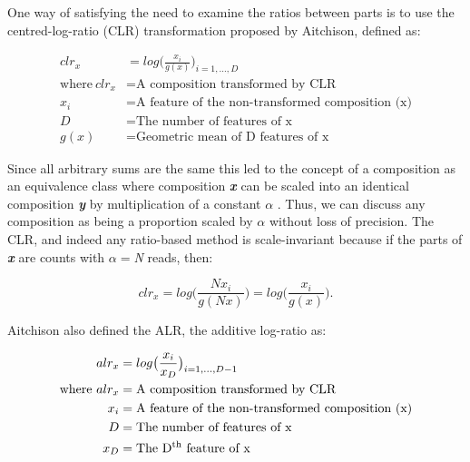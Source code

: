 \documentclass [10pt]{article}
\begin{document}
One way of satisfying the need to examine the ratios between parts is to use the centred-log-ratio (CLR) transformation proposed by Aitchison, defined as: 

\begin{equation}
\begin{split}
clr_x &= log  \big( \frac{x_i}{g(x)}   \big)_{i=1,\dots,D} \\
\text{where}~
	clr_x &= \text{A composition transformed by CLR} \\
	x_i &= \text{A feature of the non-transformed composition (x)} \\
	D &= \text{The number of features of x} \\ 
	g(x) &= \text{Geometric mean of D features of x}
\end{split}
\label{eq:CLR}
\end{equation}

Since all arbitrary sums are the same this led to the concept of a composition as an equivalence class where composition \textit{\bf{x}} can be scaled into an identical composition \textit{\textbf{y}} by multiplication of a constant $\alpha$ . Thus, we can discuss any composition as being a proportion scaled by $\alpha$ without loss of precision. The CLR, and indeed any ratio-based method is scale-invariant because if the parts of \textit{\textbf{x}} are counts with $\alpha=$\textit{N} reads, then: 

\begin{equation}
	clr_x= log\big( \frac{Nx_i}{g(Nx)}   \big) =  log\big( \frac{x_i}{g(x)}  \big).
\label{eq:equip}
\end{equation}

Aitchison \citeyear{Aitchison:1986} also defined the ALR, the additive log-ratio as: 

\begin{equation}
\begin{split}
alr_x &= log  \big( \frac{x_i}{x_D}   \big)_{i=1,\dots,D-1} \\
\text{where}~
	alr_x &= \text{A composition transformed by CLR} \\
	x_i &= \text{A feature of the non-transformed composition (x)} \\
	D &= \text{The number of features of x} \\ 
	x_D &= \text{The D\textsuperscript{th} feature of x}
\end{split}
\label{eq:ALR}
\end{equation}
\end{document}

